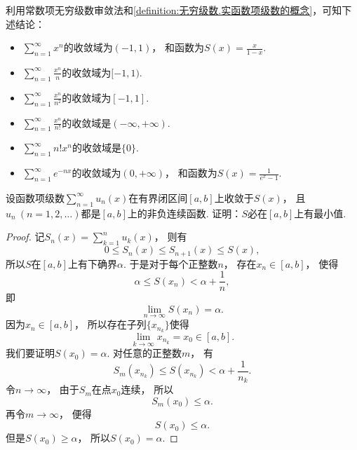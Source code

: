 \begin{example}
利用常数项无穷级数审敛法和\cref{definition:无穷级数.实函数项级数的概念}，可知下述结论：
\begin{itemize}
	\item \(\sum_{n=1}^\infty x^n\)的收敛域为\((-1,1)\)，
	和函数为\(S(x) = \frac{x}{1-x}\).
	\item \(\sum_{n=1}^\infty \frac{x^n}{n}\)的收敛域为\([-1,1)\).
	\item \(\sum_{n=1}^\infty \frac{x^n}{n^2}\)的收敛域为\([-1,1]\).
	\item \(\sum_{n=1}^\infty \frac{x^n}{n!}\)的收敛域是\((-\infty,+\infty)\).
	\item \(\sum_{n=1}^\infty n! x^n\)的收敛域是\(\{0\}\).
	\item \(\sum_{n=1}^\infty e^{-nx}\)的收敛域为\((0,+\infty)\)，
	和函数为\(S(x) = \frac1{e^x-1}\).
\end{itemize}
\end{example}

\begin{example}
设函数项级数\(\sum_{n=1}^\infty u_n(x)\)在有界闭区间\([a,b]\)上收敛于\(S(x)\)，
且\(u_n\ (n=1,2,\dotsc)\)都是\([a,b]\)上的非负连续函数.
证明：\(S\)必在\([a,b]\)上有最小值.
\begin{proof}
记\(S_n(x) = \sum_{k=1}^n u_k(x)\)，
则有\[
	0 \leq S_n(x) \leq S_{n+1}(x) \leq S(x),
\]
所以\(S\)在\([a,b]\)上有下确界\(\alpha\).
于是对于每个正整数\(n\)，
存在\(x_n\in[a,b]\)，
使得\[
	\alpha \leq S(x_n) < \alpha + \frac1n,
\]
即\[
	\lim_{n\to\infty} S(x_n) = \alpha.
\]
因为\(x_n\in[a,b]\)，
所以存在子列\(\{x_{n_k}\}\)使得\[
	\lim_{k\to\infty} x_{n_k} = x_0 \in [a,b].
\]
我们要证明\(S(x_0) = \alpha\).
对任意的正整数\(m\)，
有\[
	S_m(x_{n_k})
	\leq S(x_{n_k})
	< \alpha + \frac1{n_k}.
\]
令\(n\to\infty\)，
由于\(S_m\)在点\(x_0\)连续，
所以\[
	S_m(x_0) \leq \alpha.
\]
再令\(m\to\infty\)，
便得\[
	S(x_0) \leq \alpha.
\]
但是\(S(x_0) \geq \alpha\)，
所以\(S(x_0) = \alpha\).
\end{proof}
\end{example}

